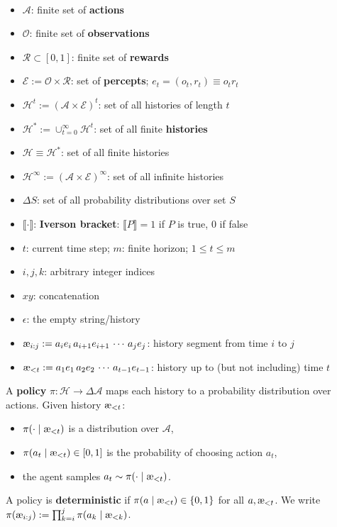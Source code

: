 \documentclass[fontsize=11pt, parskip=half]{scrartcl}
\newcommand{\cA}{\mathcal{A}}
\newcommand{\cO}{\mathcal{O}}
\newcommand{\cR}{\mathcal{R}}
\newcommand{\cE}{\mathcal{E}}
\newcommand{\cH}{\mathcal{H}}
\newcommand{\aes}{\textnormal{\ae}}
\begin{document}
\begin{definition}\label{def:spaces}\
\begin{itemize}\itemsep=2pt
    \item $\cA$: finite set of \textbf{actions}
    \item $\cO$: finite set of \textbf{observations}
    \item $\cR \subset [0,1]$: finite set of \textbf{rewards}
    \item $\cE := \cO \times \cR$: set of \textbf{percepts}; $e_t = (o_t, r_t) \equiv o_tr_t$
    \item $\cH^t := (\cA \times \cE)^t$: set of all histories of length $t$
    \item $\cH^* := \cup_{t=0}^\infty \cH^t$: set of all finite \textbf{histories}
    \item $\cH \equiv \cH^*$: set of all finite histories
    \item $\cH^\infty := (\cA \times \cE)^\infty$: set of all infinite histories
    \item $\Delta S$: set of all probability distributions over set $S$
    \item $\llbracket \cdot \rrbracket$: \textbf{Iverson bracket}: $\llbracket P \rrbracket = 1$ if $P$ is true, $0$ if false
    \item $t$: current time step; $m$: finite horizon; $1 \leq t \leq m$
    \item $i, j, k$: arbitrary integer indices
    \item $xy$: concatenation
    \item $\epsilon$: the empty string/history 
    \item $\aes_{i:j} := a_i e_i\, a_{i+1} e_{i+1} \,\cdots\, a_j e_j$: history segment from time $i$ to $j$
    \item $\aes_{<t} := a_1 e_1\, a_2 e_2 \,\cdots\, a_{t-1} e_{t-1}$: history up to (but not including) time $t$
\end{itemize}
\end{definition}

\begin{definition}[Policy $\pi$]\label{def:policy}
A \textbf{policy} $\pi : \cH \to \Delta \cA$ maps each history to a probability distribution over actions. Given history $\aes_{<t}$:
\begin{itemize}\itemsep=2pt
    \item $\pi(\cdot \mid \aes_{<t})$ is a distribution over $\cA$,
    \item $\pi(a_t \mid \aes_{<t}) \in [0,1]$ is the probability of choosing action $a_t$,
    \item the agent samples $a_t \sim \pi(\cdot \mid \aes_{<t})$.
\end{itemize}
A policy is \textbf{deterministic} if $\pi(a \mid \aes_{<t}) \in \{0,1\}$ for all $a, \aes_{<t}$.
We write $\pi(\aes_{i:j}) := \prod_{k=i}^j \pi(a_k \mid \aes_{<k})$.
\end{definition}
\end{document}
